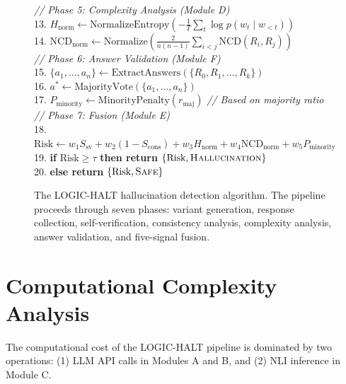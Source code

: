 \begin{figure}[!htbp]
{{\textit{// Phase 5: Complexity Analysis (Module D)}\\
13. $H_{\text{norm}} \gets \text{NormalizeEntropy}\!\left(-\frac{1}{T}\sum_t \log p(w_t \mid w_{<t})\right)$\\
14. $\text{NCD}_{\text{norm}} \gets \text{Normalize}\!\left(\frac{2}{n(n{-}1)} \sum_{i<j} \text{NCD}(R_i, R_j)\right)$\\[6pt]

\textit{// Phase 6: Answer Validation (Module F)}\\
15. $\{a_1, \ldots, a_n\} \gets \text{ExtractAnswers}(\{R_0, R_1, \ldots, R_k\})$\\
16. $a^* \gets \text{MajorityVote}(\{a_1, \ldots, a_n\})$\\
17. $P_{\text{minority}} \gets \text{MinorityPenalty}(r_{\text{maj}})$ \hfill \textit{// Based on majority ratio}\\[6pt]

\textit{// Phase 7: Fusion (Module E)}\\
18. $\text{Risk} \gets w_1 S_{\text{sv}} + w_2 (1 - S_{\text{cons}}) + w_3 H_{\text{norm}} + w_4 \text{NCD}_{\text{norm}} + w_5 P_{\text{minority}}$\\
19. \textbf{if} $\text{Risk} \geq \tau$ \textbf{then return} $\{\text{Risk}, \textsc{Hallucination}\}$\\
20. \textbf{else return} $\{\text{Risk}, \textsc{Safe}\}$
}}
\caption{The LOGIC-HALT hallucination detection algorithm. The pipeline proceeds through seven phases: variant generation, response collection, self-verification, consistency analysis, complexity analysis, answer validation, and five-signal fusion.}
\label{alg:logichalt}
\end{figure}


\section{Computational Complexity Analysis}

The computational cost of the LOGIC-HALT pipeline is dominated by two operations: (1) LLM API calls in Modules A and B, and (2) NLI inference in Module C.

